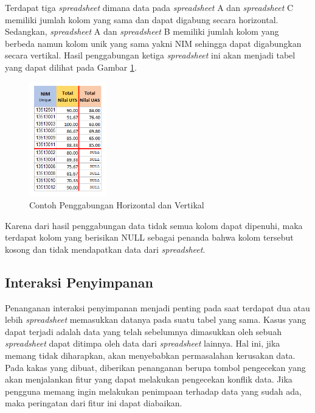 \begin{enumerate}
	Terdapat tiga \textit{spreadsheet} dimana data pada \textit{spreadsheet} A dan \textit{spreadsheet} C memiliki jumlah kolom yang sama dan dapat digabung secara horizontal. Sedangkan, \textit{spreadsheet} A dan \textit{spreadsheet} B memiliki jumlah kolom yang berbeda namun kolom unik yang sama yakni NIM sehingga dapat digabungkan secara vertikal. Hasil penggabungan ketiga \textit{spreadsheet} ini akan menjadi tabel yang dapat dilihat pada Gambar \ref{BothMerge}.

	\begin{figure}[!htb]
	    \centering
	    \includegraphics[width=0.3\textwidth]{resources/chapter-3-both-merge-db.png}
	    \caption{Contoh Penggabungan Horizontal dan Vertikal}
		\label{BothMerge}
	\end{figure}

	Karena dari hasil penggabungan data tidak semua kolom dapat dipenuhi, maka terdapat kolom yang berisikan NULL sebagai penanda bahwa kolom tersebut kosong dan tidak mendapatkan data dari \textit{spreadsheet}.
\end{enumerate}

\subsection{Interaksi Penyimpanan}
Penanganan interaksi penyimpanan menjadi penting pada saat terdapat dua atau lebih \textit{spreadsheet} memasukkan datanya pada suatu tabel yang sama. Kasus yang dapat terjadi adalah data yang telah sebelumnya dimasukkan oleh sebuah \textit{spreadsheet} dapat ditimpa oleh data dari \textit{spreadsheet} lainnya. Hal ini, jika memang tidak diharapkan, akan menyebabkan permasalahan kerusakan data. Pada kakas yang dibuat, diberikan penanganan berupa tombol pengecekan yang akan menjalankan fitur yang dapat melakukan pengecekan konflik data. Jika pengguna memang ingin melakukan penimpaan terhadap data yang sudah ada, maka peringatan dari fitur ini dapat diabaikan.

